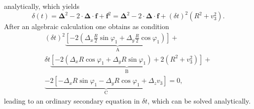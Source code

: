 analytically, which yields
\begin{equation}
	\delta (t) = \boldsymbol{\Delta}^2 - 2 \cdot \boldsymbol{\Delta}\cdot\boldsymbol{f} + \boldsymbol{f}^2 = \boldsymbol{\Delta}^2- 2 \cdot \boldsymbol{\Delta}\cdot\boldsymbol{f}+(\delta t)^2 (R^2+v^2_3).
\end{equation}
After an algebraic calculation one obtains as condition
\begin{multline}
	(\delta t)^2 \underbrace{\left[-2\left(\Delta_x \frac{R}{2}\sin\varphi_1+ \Delta_y\frac{R}{2}\cos\varphi_1\right)\right]}_\text{A} + \\
	\delta t \underbrace{\left[-2(\Delta_x R\cos\varphi_1 + \Delta_y R \sin\varphi_1)+2(R^2+v^2_3)\right]}_\text{B} + \\
	\underbrace{-2 \left[-\Delta_x R \sin\varphi_1-\Delta_y R \cos\varphi_1+\Delta_z v_3\right]}_\text{C}=0,
\end{multline}
leading to an ordinary secondary equation in $\delta t$, which can be solved analytically.